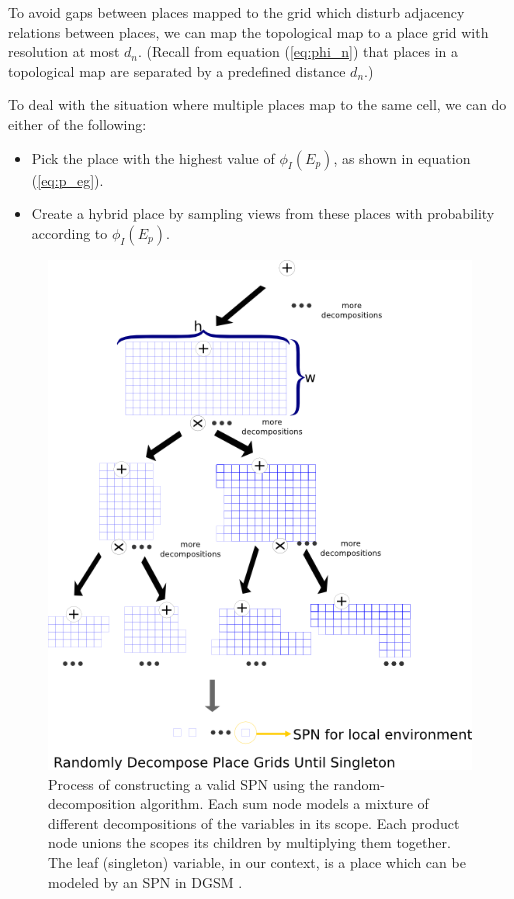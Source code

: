 \documentclass[10pt, titlepage]{article}
\theoremstyle{definition}
\begin{document}
To avoid gaps between places mapped to the grid which disturb adjacency relations between places, we can map the topological map to a place grid with resolution at most $d_n$. (Recall from equation (\ref{eq:phi_n}) that places in a topological map are separated by a predefined distance $d_n$.)\label{sc:avoidgaps}

To deal with the situation where multiple places map to the same cell, we can do either of the following:
\begin{itemize}
\item Pick the place with the highest value of $\phi_I(E_p)$, as shown in equation (\ref{eq:p_eg}). 
\item Create a hybrid place by sampling views from these places with probability according to $\phi_I(E_p)$.
\end{itemize}

\begin{figure}[!htb]
    \centering
    \captionsetup{width=.8\linewidth}
    \includegraphics[scale=0.6]{images/spn_grid.png}
    \caption{Process of constructing a valid SPN using the random-decomposition algorithm. Each sum node models a mixture of different decompositions of the variables in its scope. Each product node unions the scopes its children by multiplying them together. The leaf (singleton) variable, in our context, is a place which can be modeled by an SPN in DGSM \cite{pronobis2016learning}.}
    \label{fig:grid_learn}
\end{figure}
\end{document}
